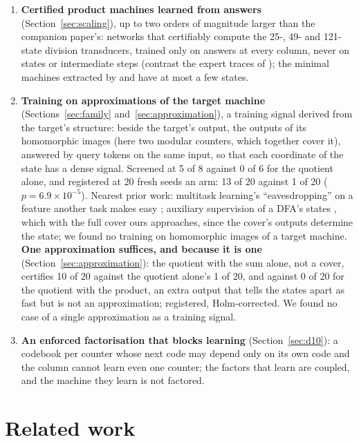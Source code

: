 \documentclass[11pt]{article}
\begin{document}
\begin{enumerate}
\item \textbf{Certified product machines learned from answers} (Section~\ref{sec:scaling}), up to two
  orders of magnitude larger than the companion paper's: networks that certifiably compute the
  25-, 49- and 121-state division transducers, trained only on answers at every column, never
  on states or intermediate steps (contrast the expert traces of
  \citet{papazov-2025-exact-learning-arithmetic-differentiable-agents}); the minimal machines
  extracted by \citet{wang-2019-state-regularized-rnns} and
  \citet{oliva-2020-dual-recurrent-memory-processing} have at most a few states.
\item \textbf{Training on approximations of the target machine} (Sections~\ref{sec:family}
  and~\ref{sec:approximation}), a training
  signal derived from the target's structure: beside the target's output, the outputs of its homomorphic images (here two modular counters, which together
  cover it), answered by query tokens on the same input, so that each coordinate of the state has a
  dense signal. Screened at 5 of 8 against 0 of 6 for the quotient alone, and registered at 20 fresh
  seeds an arm: 13 of 20 against 1 of 20 ($p = 6.9 \times 10^{-5}$). Nearest prior work: multitask learning's
  ``eavesdropping'' on a feature another task makes easy \citep{caruana-1997-multitask-learning};
  auxiliary supervision of a DFA's states \citep{dan-2022-robust-generalization-regular-languages},
  which with the full cover ours approaches, since the cover's outputs determine the state; we found
  no training on homomorphic images of a target machine. \textbf{One approximation suffices, and
  because it is one} (Section~\ref{sec:approximation}): the quotient with the sum alone, not a
  cover, certifies 10 of 20 against the quotient alone's 1 of 20, and against 0 of 20 for the
  quotient with the product, an extra output that tells the states apart as fast but is not an
  approximation; registered, Holm-corrected. We found no case of a single approximation as a
  training signal.
\item \textbf{An enforced factorisation that blocks learning} (Section~\ref{sec:d10}): a codebook
  per counter whose next code may depend only on its own code and the column cannot learn even one
  counter; the factors that learn are coupled, and the machine they learn is not factored.
\end{enumerate}

\section{Related work}
\label{sec:related}
\end{document}
